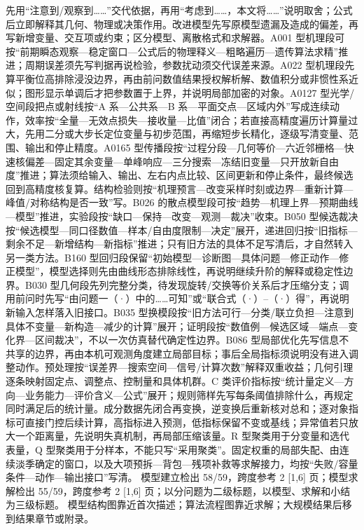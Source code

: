 \documentclass[withoutpreface,bwprint]{cumcmthesis}
\newcommand{\MCMBuildLength}{模型建立检出 58/59，跨度参考 2 [1,6] 页}
\newcommand{\MCMSolveLength}{模型求解检出 55/59，跨度参考 2 [1,6] 页}
\begin{document}
  {先用“注意到/观察到……”交代依据，再用“考虑到……，本文将……”说明取舍；公式后立即解释其几何、物理或决策作用。改进模型先写原模型遗漏及造成的偏差，再写新增变量、交互项或约束；区分模型、离散格式和求解器。A001 型机理段可按“前期瞬态观察—稳定窗口—公式后的物理释义—粗略遍历—遗传算法求精”推进；周期误差须先写判据再说检验，参数扰动须交代误差来源。A022 型机理段先算平衡位高排除浸没边界，再由前问数值结果授权解析解、数值积分或非惯性系近似；图形显示单调后才把参数置于上界，并说明局部加密的对象。A0127 型光学/空间段把点或射线按“A 系—公共系—B 系—平面交点—区域内外”写成连续动作，效率按“全量—无效点损失—接收量—比值”闭合；若直接高精度遍历计算量过大，先用二分或大步长定位变量与初步范围，再缩短步长精化，逐级写清变量、范围、输出和停止精度。A0165 型传播段按“过程分段—几何等价—六近邻栅格—快速核偏差—固定其余变量—单峰响应—三分搜索—冻结旧变量—只开放新自由度”推进；算法须给输入、输出、左右内点比较、区间更新和停止条件，最终候选回到高精度核复算。结构检验则按“机理预言—改变采样时刻或边界—重新计算—峰值/对称结构是否一致”写。B026 的散点模型段可按“趋势—机理上界—预期曲线—模型”推进，实验段按“缺口—保持—改变—观测—裁决”收束。B050 型候选裁决按“候选模型—同口径数值—样本/自由度限制—决定”展开，递进回归按“旧指标—剩余不足—新增结构—新指标”推进；只有旧方法的具体不足写清后，才自然转入另一类方法。B160 型回归段保留“初始模型—诊断图—具体问题—修正动作—修正模型”，模型选择则先由曲线形态排除线性，再说明继续升阶的解释或稳定性边界。B030 型几何段先列完整分类，待发现旋转/交换等价关系后才压缩分支；调用前问时先写“由问题一（·）中的……可知”或“联合式（·）--（·）得”，再说明新输入怎样落入旧接口。B035 型换模段按“旧方法可行—分类/联立负担—注意到具体不变量—新构造—减少的计算”展开；证明段按“数值例—候选区域—端点—变化界—区间裁决”，不以一次仿真替代确定性边界。B086 型局部优化先写信息不共享的边界，再由本机可观测角度建立局部目标；事后全局指标须说明没有进入调整动作。预处理按“误差界—搜索空间—信号/计算次数”解释双重收益；几何引理逐条映射固定点、调整点、控制量和具体机群。C 类评价指标按“统计量定义—方向—业务能力—评价含义—公式”展开；规则筛样先写每条阈值排除什么，再规定同时满足后的统计量。成分数据先闭合再变换，逆变换后重新核对总和；逐对象指标可直接门控后续计算，高指标进入预测，低指标保留不变或基线；异常值若只放大一个距离量，先说明失真机制，再局部压缩该量。R 型聚类用于分变量和选代表量，Q 型聚类用于分样本，不能只写“采用聚类”。固定权重的局部失配、由连续淡季确定的窗口，以及大项预拆—背包—残项补救等求解接力，均按“失败/容量条件—动作—输出接口”写清。}
  {\MCMBuildLength；\MCMSolveLength；以分问题为二级标题，以模型、求解和小结为三级标题。}
  {模型结构图靠近首次描述；算法流程图靠近求解；大规模结果后移到结果章节或附录。}
\end{document}
